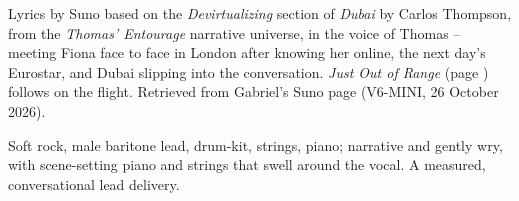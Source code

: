 
\label{sec:devirtualizing}
\begin{notes}
Lyrics by Suno based on the \emph{Devirtualizing} section of \emph{Dubai} by Carlos Thompson, from the \emph{Thomas' Entourage} narrative universe, in the voice of Thomas -- meeting Fiona face to face in London after knowing her online, the next day's Eurostar, and Dubai slipping into the conversation. \emph{Just Out of Range} (page \pageref{sec:just-out-of-range}) follows on the flight. Retrieved from Gabriel's Suno page (V6-MINI, 26 October 2026).
\end{notes}
\begin{style}
Soft rock, male baritone lead, drum-kit, strings, piano; narrative and gently wry, with scene-setting piano and strings that swell around the vocal. A measured, conversational lead delivery.
\end{style}
